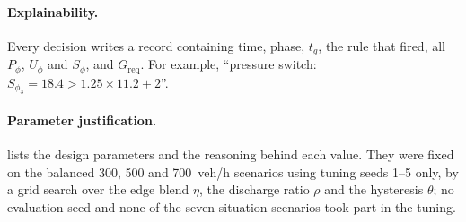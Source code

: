 \paragraph{Explainability.} Every decision writes a record containing time, phase, $t_g$, the rule
that fired, all $P_\phi$, $U_\phi$ and $S_\phi$, and $G_{\text{req}}$.  For example, ``pressure switch: $S_{\phi_3} = 18.4 > 1.25 \times
11.2 + 2$''. 

\paragraph{Parameter justification.}  lists the design parameters and the
reasoning behind each value. They were fixed on the balanced 300, 500 and 700~veh/h scenarios using tuning
seeds 1--5 only, by a grid search over the edge blend $\eta$, the discharge ratio $\rho$ and the hysteresis
$\theta$; no evaluation seed and none of the seven situation scenarios took part in the tuning.

